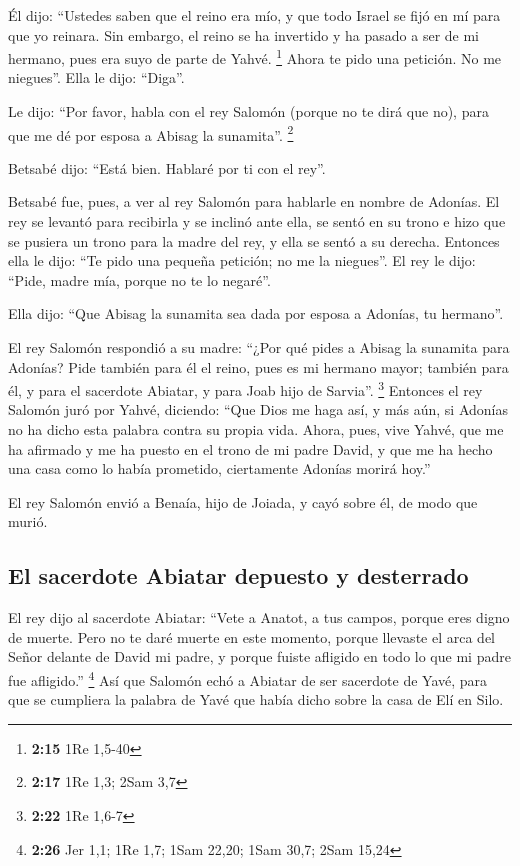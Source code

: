 \begin{paracol}{2}
 Él dijo: ``Ustedes saben que el reino era mío, y que
todo Israel se fijó en mí para que yo reinara. Sin embargo, el reino se
ha invertido y ha pasado a ser de mi hermano, pues era suyo de parte de
Yahvé. \footnote{\textbf{2:15} 1Re 1,5-40}  Ahora te pido
una petición. No me niegues''. Ella le dijo: ``Diga''.

 Le dijo: ``Por favor, habla con el rey Salomón (porque
no te dirá que no), para que me dé por esposa a Abisag la sunamita''.
\footnote{\textbf{2:17} 1Re 1,3; 2Sam 3,7}

 Betsabé dijo: ``Está bien. Hablaré por ti con el rey''.

 Betsabé fue, pues, a ver al rey Salomón para hablarle en
nombre de Adonías. El rey se levantó para recibirla y se inclinó ante
ella, se sentó en su trono e hizo que se pusiera un trono para la madre
del rey, y ella se sentó a su derecha.  Entonces ella le
dijo: ``Te pido una pequeña petición; no me la niegues''. El rey le
dijo: ``Pide, madre mía, porque no te lo negaré''.

 Ella dijo: ``Que Abisag la sunamita sea dada por esposa
a Adonías, tu hermano''.

 El rey Salomón respondió a su madre: ``¿Por qué pides a
Abisag la sunamita para Adonías? Pide también para él el reino, pues es
mi hermano mayor; también para él, y para el sacerdote Abiatar, y para
Joab hijo de Sarvia''. \footnote{\textbf{2:22} 1Re 1,6-7}
 Entonces el rey Salomón juró por Yahvé, diciendo: ``Que
Dios me haga así, y más aún, si Adonías no ha dicho esta palabra contra
su propia vida.  Ahora, pues, vive Yahvé, que me ha
afirmado y me ha puesto en el trono de mi padre David, y que me ha hecho
una casa como lo había prometido, ciertamente Adonías morirá hoy.''

 El rey Salomón envió a Benaía, hijo de Joiada, y cayó
sobre él, de modo que murió.

\hypertarget{el-sacerdote-abiatar-depuesto-y-desterrado}{%
\subsection{El sacerdote Abiatar depuesto y
desterrado}\label{el-sacerdote-abiatar-depuesto-y-desterrado}}

 El rey dijo al sacerdote Abiatar: ``Vete a Anatot, a tus
campos, porque eres digno de muerte. Pero no te daré muerte en este
momento, porque llevaste el arca del Señor delante de David mi padre, y
porque fuiste afligido en todo lo que mi padre fue afligido.''
\footnote{\textbf{2:26} Jer 1,1; 1Re 1,7; 1Sam 22,20; 1Sam 30,7; 2Sam
  15,24}  Así que Salomón echó a Abiatar de ser sacerdote
de Yavé, para que se cumpliera la palabra de Yavé que había dicho sobre
la casa de Elí en Silo.


\end{paracol}
